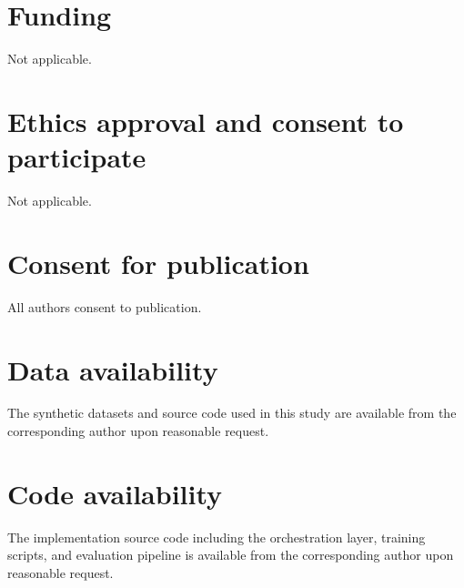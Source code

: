 \documentclass[a4paper,fleqn]{cas-dc}
\begin{document}
\section*{Funding}

Not applicable.

\section*{Ethics approval and consent to participate}

Not applicable.

\section*{Consent for publication}

All authors consent to publication.

\section*{Data availability}

The synthetic datasets and source code used in this study are available from the corresponding author upon reasonable request.

\section*{Code availability}

The implementation source code including the orchestration layer, training scripts, and evaluation pipeline is available from the corresponding author upon reasonable request.

\printcredits






\end{document}

